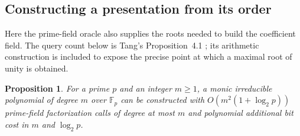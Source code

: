 \documentclass[11pt]{article}
\newtheorem{proposition}[theorem]{Proposition}
\theoremstyle{definition}
\theoremstyle{remark}
\begin{document}
\subsection{Constructing a presentation from its order}

Here the prime-field oracle also supplies the roots needed to build
the coefficient field. The query count below is Tang's
Proposition~4.1 \cite[pp.~5--7]{Tang2026}; its arithmetic construction
is included to expose the precise point at which a maximal root of
unity is obtained.

\begin{proposition}\label{prop:tangpresentation}
For a prime $p$ and an integer $m\geq1$, a monic irreducible
polynomial of degree $m$ over $\mathbb F_p$ can be constructed with
$O(m^2(1+\log_2p))$ prime-field factorization calls of degree at
most $m$ and polynomial additional bit cost in $m$ and $\log_2p$.
\end{proposition}
\end{document}
